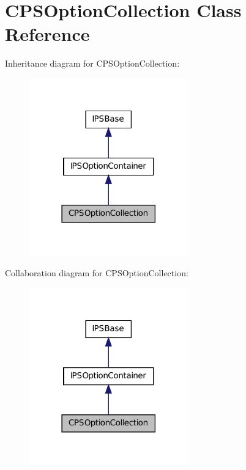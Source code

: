 \hypertarget{classCPSOptionCollection}{
\section{CPSOptionCollection Class Reference}
\label{classCPSOptionCollection}
}


Inheritance diagram for CPSOptionCollection:\nopagebreak
\begin{figure}[H]
\begin{center}
\leavevmode
\includegraphics[width=194pt]{classCPSOptionCollection__inherit__graph}
\end{center}
\end{figure}


Collaboration diagram for CPSOptionCollection:\nopagebreak
\begin{figure}[H]
\begin{center}
\leavevmode
\includegraphics[width=194pt]{classCPSOptionCollection__coll__graph}
\end{center}
\end{figure}
